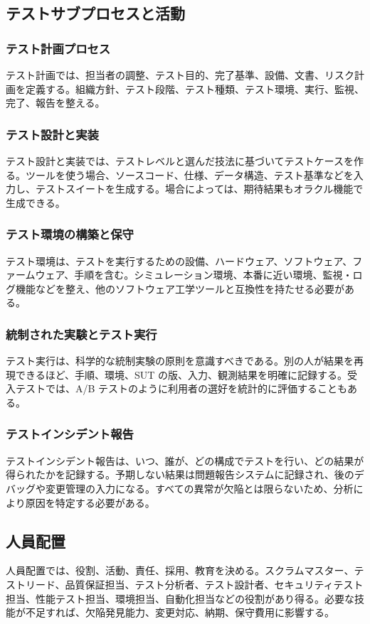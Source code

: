 \documentclass[uplatex,dvipdfmx,a4paper,11pt,nomag]{jsarticle}
\begin{document}
\subsection{テストサブプロセスと活動}
\subsubsection{テスト計画プロセス}
テスト計画では、担当者の調整、テスト目的、完了基準、設備、文書、リスク計画を定義する。組織方針、テスト段階、テスト種類、テスト環境、実行、監視、完了、報告を整える。

\subsubsection{テスト設計と実装}
テスト設計と実装では、テストレベルと選んだ技法に基づいてテストケースを作る。ツールを使う場合、ソースコード、仕様、データ構造、テスト基準などを入力し、テストスイートを生成する。場合によっては、期待結果もオラクル機能で生成できる。

\subsubsection{テスト環境の構築と保守}
テスト環境は、テストを実行するための設備、ハードウェア、ソフトウェア、ファームウェア、手順を含む。シミュレーション環境、本番に近い環境、監視・ログ機能などを整え、他のソフトウェア工学ツールと互換性を持たせる必要がある。

\subsubsection{統制された実験とテスト実行}
テスト実行は、科学的な統制実験の原則を意識すべきである。別の人が結果を再現できるほど、手順、環境、SUT の版、入力、観測結果を明確に記録する。受入テストでは、A/B テストのように利用者の選好を統計的に評価することもある。

\subsubsection{テストインシデント報告}
テストインシデント報告は、いつ、誰が、どの構成でテストを行い、どの結果が得られたかを記録する。予期しない結果は問題報告システムに記録され、後のデバッグや変更管理の入力になる。すべての異常が欠陥とは限らないため、分析により原因を特定する必要がある。

\subsection{人員配置}
人員配置では、役割、活動、責任、採用、教育を決める。スクラムマスター、テストリード、品質保証担当、テスト分析者、テスト設計者、セキュリティテスト担当、性能テスト担当、環境担当、自動化担当などの役割があり得る。必要な技能が不足すれば、欠陥発見能力、変更対応、納期、保守費用に影響する。
\end{document}
